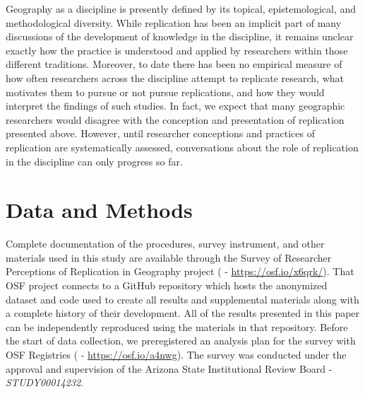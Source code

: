 \documentclass[]{interact}
\theoremstyle{plain}%
\theoremstyle{definition}
\theoremstyle{remark}
\begin{document}
Geography as a discipline is presently defined by its topical, epistemological, and methodological diversity. 
While replication has been an implicit part of many discussions of the development of knowledge in the discipline, it remains unclear exactly how the practice is understood and applied by researchers within those different traditions.
Moreover, to date there has been no empirical measure of how often researchers across the discipline attempt to replicate research, what motivates them to pursue or not pursue replications, and how they would interpret the findings of such studies. 
In fact, we expect that many geographic researchers would disagree with the conception and presentation of replication presented above. 
However, until researcher conceptions and practices of replication are systematically assessed, conversations about the role of replication in the discipline can only progress so far.


\section*{Data and Methods}
Complete documentation of the procedures, survey instrument, and other materials used in this study are available through the Survey of Researcher Perceptions of Replication in Geography project (\citet{Kedron_Holler_Bardin_Hilgendorf_2022} - \url{https://osf.io/x6qrk/}).
That OSF project connects to a GitHub repository which hosts the anonymized dataset and code used to create all results and supplemental materials along with a complete history of their development. 
All of the results presented in this paper can be independently reproduced using the materials in that repository.
Before the start of data collection, we preregistered an analysis plan for the survey with OSF Registries (\citet{Kedron_RPl_Survey_PAP} - \url{https://osf.io/a4nwg}). 
The survey was conducted under the approval and supervision of the Arizona State Institutional Review Board - \textit{STUDY00014232}.

\end{document}
